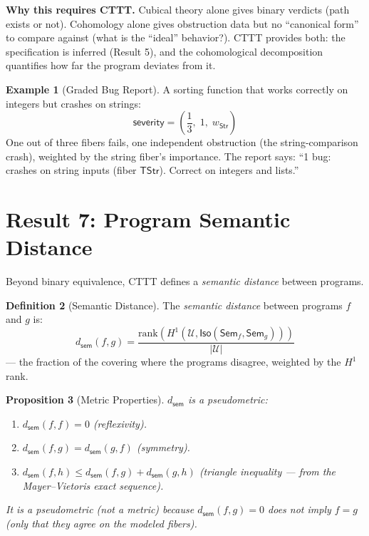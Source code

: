 \documentclass[11pt,a4paper]{report}
\theoremstyle{definition}
\newtheorem{definition}{Definition}[chapter]
\newtheorem{example}[definition]{Example}
\theoremstyle{plain}
\newtheorem{proposition}[definition]{Proposition}
\newcommand{\covers}{\mathcal{U}}
\newcommand{\Sem}{\mathsf{Sem}}
\newcommand{\Iso}{\mathsf{Iso}}
\newcommand{\Hone}{H^1}
\begin{document}
\textbf{Why this requires CTTT.}
Cubical theory alone gives binary verdicts (path exists or not).
Cohomology alone gives obstruction data but no ``canonical form''
to compare against (what is the ``ideal'' behavior?).
CTTT provides both: the specification is inferred (Result 5),
and the cohomological decomposition quantifies how far the program
deviates from it.

\begin{example}[Graded Bug Report]
A sorting function that works correctly on integers but crashes on
strings:
\[
  \mathsf{severity} = \left(\frac{1}{3},\; 1,\;
    w_\mathsf{Str}\right)
\]
One out of three fibers fails, one independent obstruction (the
string-comparison crash), weighted by the string fiber's importance.
The report says: ``1 bug: crashes on string inputs (fiber
$\mathsf{TStr}$). Correct on integers and lists.''
\end{example}

\section{Result 7: Program Semantic Distance}

Beyond binary equivalence, CTTT defines a \emph{semantic distance}
between programs.

\begin{definition}[Semantic Distance]
\label{def:sem-distance}
The \emph{semantic distance} between programs $f$ and $g$ is:
\[
  d_\mathsf{sem}(f, g) = \frac{\mathrm{rank}(\Hone(\covers,
    \Iso(\Sem_f, \Sem_g)))}{|\covers|}
\]
--- the fraction of the covering where the programs disagree,
weighted by the $\Hone$ rank.
\end{definition}

\begin{proposition}[Metric Properties]
$d_\mathsf{sem}$ is a pseudometric:
\begin{enumerate}
  \item $d_\mathsf{sem}(f, f) = 0$ (reflexivity).
  \item $d_\mathsf{sem}(f, g) = d_\mathsf{sem}(g, f)$ (symmetry).
  \item $d_\mathsf{sem}(f, h) \leq d_\mathsf{sem}(f, g) +
    d_\mathsf{sem}(g, h)$ (triangle inequality --- from the
    Mayer--Vietoris exact sequence).
\end{enumerate}
It is a pseudometric (not a metric) because $d_\mathsf{sem}(f, g) = 0$
does not imply $f = g$ (only that they agree on the modeled fibers).
\end{proposition}
\end{document}
